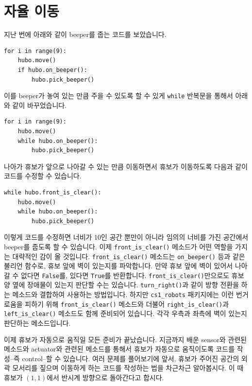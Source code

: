\documentclass[../main.tex]{subfiles}
\begin{document}
\section{자율 이동}
지난 번에 아래와 같이 beeper를 줍는 코드를 보았습니다.
\begin{verbatim}
for i in range(9):
    hubo.move()
    if hubo.on_beeper():
        hubo.pick_beeper()
\end{verbatim}
이를 beeper가 놓여 있는 만큼 주을 수 있도록 할 수 있게 \texttt{while} 반복문을 통해서 아래와 같이 바꾸었습니다.
\begin{verbatim}
for i in range(9):
    hubo.move()
    while hubo.on_beeper():
        hubo.pick_beeper()
\end{verbatim}
나아가 휴보가 앞으로 나아갈 수 있는 만큼 이동하면서 휴보가 이동하도록 다음과 같이 코드를 수정할 수 있습니다.
\begin{verbatim}
while hubo.front_is_clear():
    hubo.move()
    while hubo.on_beeper():
        hubo.pick_beeper()
\end{verbatim}
이렇게 코드를 수정하면 너비가 10인 공간 뿐만이 아니라 임의의 너비를 가진 공간에서 beeper를 줍도록 할 수 있습니다.
이제 \texttt{front\_is\_clear()} 메소드가 어떤 역할을 가지는 대략적인 감이 올 것입니다.
\texttt{front\_is\_clear()} 메소드는 \texttt{on\_beeper()} 등과 같은 불리언 함수로, 휴보 앞에 벽이 있는지를 파악합니다.
만약 휴보 앞에 벽이 있어서 나아갈 수 없다면 \texttt{False}를, 있다면 \texttt{True}를 반환합니다.
\texttt{front\_is\_clear()}만으로도 휴보 양 옆에 장애물이 있는지 판단할 수는 있습니다.
\texttt{turn\_right()}과 같이 방향 전환을 하는 메소드와 결합하여 사용하는 방법입니다.
하지만 \texttt{cs1\_robots} 패키지에는 이런 번거로움을 피하기 위해 \texttt{front\_is\_clear()} 메소드와 더불어 \texttt{right\_is\_clear()}과 \texttt{left\_is\_clear()} 메소드도 함께 준비되어 있습니다.
각각 우측과 좌측에 벽이 있는지 판단하는 메소드입니다.

이제 휴보가 자동으로 움직일 모든 준비가 끝났습니다.
지금까지 배운 sensor와 관련된 메소드와 actuator와 관련된 메소드를 통해서 휴보가 자동으로 움직이도록 코드를 작성--즉 control--할 수 있습니다.
여러 문제를 풀어보기에 앞서, 휴보가 주어진 공간의 외곽 모서리를 짚으며 이동하게 하는 코드를 작성하는 법을 차근차근 알아봅시다.
이 때 휴보가 $(1, 1)$에서 반시계 방향으로 돌아간다고 합시다.
\end{document}
